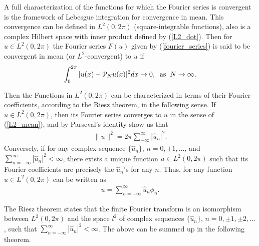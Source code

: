 	A full characterization of the functions for which the Fourier series is convergent is the framework of Lebesgue integration for convergence in mean. This convergence can be defined in $L^2 (0, 2 \pi)$ (square-integrable functions), also is a complex Hilbert space with inner product defined by (\ref{L2_dot}). Then for $u \in L^2 (0, 2 \pi)$ the Fourier series $F(u)$ given by (\ref{fourier_series}) is said to be convergent in mean (or $L^2$-convergent) to $u$ if
	\begin{align}
		\label{L2_mean}
		\displaystyle \int_{0}^{2 \pi} |u(x) - \mathcal{P}_N u(x) |^2 dx \rightarrow 0, \hspace{2mm} \text{as} \hspace{2mm} N \rightarrow \infty,
	\end{align}
	
	Then the Functions in $L^2 (0, 2 \pi)$ can be characterized in terms of their Fourier coefficients, according to the Riesz theorem, in the following sense. If $u \in L^2 (0, 2 \pi)$, then its Fourier series converges to $u$ in the sense of (\ref{L2_mean}), and by Parseval's identity show us that
	\begin{align}
	\label{parseval}
		\| u \|^2 = 2 \pi \displaystyle \sum^{\infty}_{-\infty} |\hat{u}_n|^2.
	\end{align}
	Conversely, if for any complex sequence $\{\hat{u}_n \}$, $n = 0, \pm 1, \dots $, and $\sum^{\infty}_{n=-\infty} |\hat{u}_n|^2 < \infty$, there exists a unique function $u \in L^2 (0, 2 \pi)$ such that its Fourier coefficients are precisely the $\hat{u}_n$$'$s for any $n$. Thus, for any function $u \in L^2 (0, 2 \pi)$ can be written as
	\begin{align}
		u = \displaystyle \sum^{\infty}_{n=-\infty} \hat{u}_n \phi_n.
	\end{align}
	
	The Riesz theorem states that the finite Fourier transform is an isomorphism between $L^2 (0, 2\pi)$ and the space $l^2$ of complex sequences $\{\hat{u}_n \}$, $n = 0, \pm1, \pm2, \dots$, such that $\sum^{\infty}_{n=-\infty} |\hat{u}_n|^2 < \infty$. The above can be summed up in the following theorem. 
	
